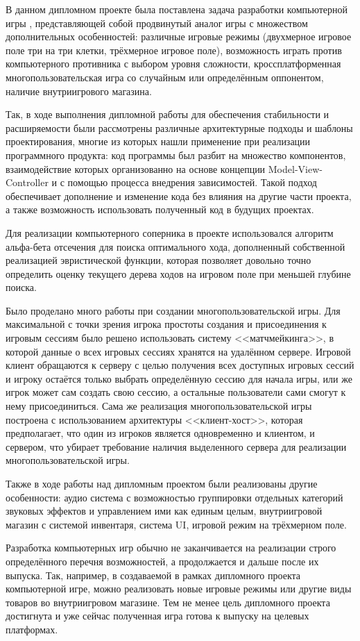 \newpage
{}
{}

В данном дипломном проекте была поставлена задача разработки компьютерной игры \BinaryWars, представляющей собой продвинутый аналог игры \TicTacToe с множеством дополнительных особенностей: различные игровые режимы (двухмерное игровое поле три на три клетки, трёхмерное игровое поле), возможность играть против компьютерного противника с выбором уровня сложности, кроссплатформенная многопользовательская игра со случайным или определённым оппонентом, наличие внутриигрового магазина.

Так, в ходе выполнения дипломной работы для обеспечения стабильности и расширяемости были рассмотрены различные архитектурные подходы и шаблоны проектирования, многие из которых нашли применение при реализации программного продукта: код программы был разбит на множество компонентов, взаимодействие которых организованно на основе концепции Model-View-Controller и с помощью процесса внедрения зависимостей. Такой подход обеспечивает дополнение и изменение кода без влияния на другие части проекта, а также возможность использовать полученный код в будущих проектах.

Для реализации компьютерного соперника в проекте использовался алгоритм альфа-бета отсечения для поиска оптимального хода, дополненный собственной реализацией эвристической функции, которая позволяет довольно точно определить оценку текущего дерева ходов на игровом поле при меньшей глубине поиска.

Было проделано много работы при создании многопользовательской игры. Для максимальной с точки зрения игрока простоты создания и присоединения к игровым сессиям было решено использовать систему <<матчмейкинга>>, в которой данные о всех игровых сессиях хранятся на удалённом сервере. Игровой клиент обращаются к серверу с целью получения всех доступных игровых сессий и игроку остаётся только выбрать определённую сессию для начала игры, или же игрок может сам создать свою сессию, а остальные пользователи сами смогут к нему присоединиться. Сама же реализация многопользовательской игры построена с использованием архитектуры <<клиент-хост>>, которая предполагает, что один из игроков является одновременно и клиентом, и сервером, что убирает требование наличия выделенного сервера для реализации многопользовательской игры.

Также в ходе работы над дипломным проектом были реализованы другие особенности: аудио система с возможностью группировки отдельных категорий звуковых эффектов и управлением ими как единым целым, внутриигровой магазин с системой инвентаря, система UI, игровой режим на трёхмерном поле.

Разработка компьютерных игр обычно не заканчивается на реализации строго определённого перечня возможностей, а продолжается и дальше после их выпуска. Так, например, в создаваемой в рамках дипломного проекта компьютерной игре, можно реализовать новые игровые режимы или другие виды товаров во внутриигровом магазине. Тем не менее цель дипломного проекта достигнута и уже сейчас полученная игра готова к выпуску на целевых платформах.